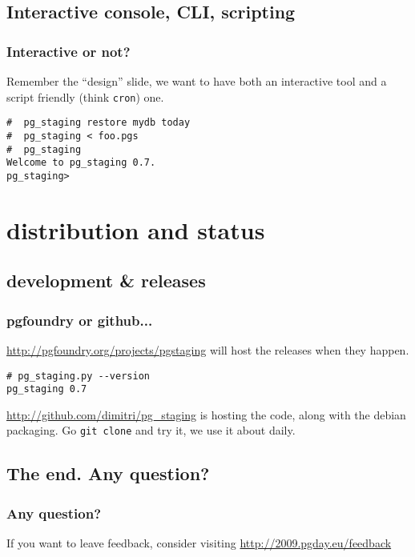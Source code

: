 \documentclass{beamer}
\begin{document}
\subsection{Interactive console, CLI, scripting}
\begin{frame}[fragile]
  \frametitle{Interactive or not?}

  Remember the ``design'' slide, we want to have both an interactive tool
  and a script friendly (think \texttt{cron}) one.

  \pause

  \begin{example}
  \begin{verbatim}
#  pg_staging restore mydb today
#  pg_staging < foo.pgs
#  pg_staging
Welcome to pg_staging 0.7.
pg_staging> 
  \end{verbatim}
  \end{example}
\end{frame}

\section{distribution and status}
\subsection{development \& releases}

\begin{frame}[fragile]
  \frametitle{pgfoundry or github...}

  \url{http://pgfoundry.org/projects/pgstaging} will host the releases when
  they happen.

  \pause

  \begin{example}
  \begin{verbatim}
# pg_staging.py --version
pg_staging 0.7
  \end{verbatim}
  \end{example}

  \pause

  \url{http://github.com/dimitri/pg_staging} is hosting the code, along with
  the debian packaging. Go \texttt{git clone} and try it, we use it about
  daily.
\end{frame}

\subsection{The end. Any question?}
\begin{frame}[fragile]
  \frametitle{Any question?}


  \linebreak
  \pause

  \begin{center}
  If you want to leave feedback, consider visiting
  \url{http://2009.pgday.eu/feedback}
  \end{center}
\end{frame}
\end{document}
